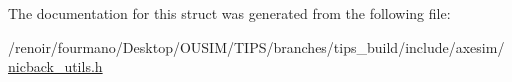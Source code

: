 The documentation for this struct was generated from the following file:\begin{DoxyCompactItemize}
\item 
/renoir/fourmano/Desktop/OUSIM/TIPS/branches/tips\_\-build/include/axesim/\hyperlink{nicback__utils_8h}{nicback\_\-utils.h}\end{DoxyCompactItemize}
